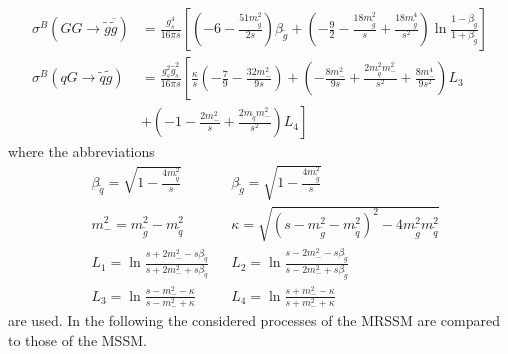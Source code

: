 \begin{align}
\sigma^B(GG \to \tilde{g}\overline{\tilde{g}}) &= \frac{g_s^4}{16\pi s} \left[ \left( -6 - \frac{51 m_{\tilde{g}}^2}{2s} \right)\beta_{\tilde{g}} + \left( -\frac{9}{2} - \frac{18 m_{\tilde{g}}^2}{s} + \frac{18 m_{\tilde{g}}^4}{s^2} \right)\ln \frac{1-\beta_{\tilde{g}}}{1+\beta_{\tilde{g}}} \right]\\
\sigma^B(q G \to \tilde{q} \tilde{g}) &= \frac{g_s^2\hat{g}_s^2}{16\pi s} \left[ \frac{\kappa}{s}\left( -\frac{7}{9} - \frac{32 m_{-}^2}{9s} \right) + \left( -\frac{8m_-^2}{9s} + \frac{2m_{\tilde{q}}^2m_-^2}{s^2} + \frac{8 m_-^4}{9s^2} \right)L_3\right.\nonumber\\
&+\left. \left( -1-\frac{2m_-^2}{s} + \frac{2m_{\tilde{q}}m_-^2}{s^2} \right)L_4 \right]
\end{align}
where the abbreviations \cite{Beenakker:1996ch} 
\begin{align}
&\beta_{\tilde{q}} = \sqrt{1-\frac{4 m_{\tilde{q}}^2}{s}} && \beta_{\tilde{g}} = \sqrt{1-\frac{4 m_{\tilde{g}}^2}{s}}\nonumber\\
&m_-^2 = m_{\tilde{g}}^2 - m_{\tilde{q}}^2 && \kappa = \sqrt{(s-m_{\tilde{g}}^2-m_{\tilde{q}}^2)^2-4m_{\tilde{g}}^2m_{\tilde{q}}^2}\nonumber\\
& L_1 = \ln \frac{s+2m_-^2 - s\beta_{\tilde{q}}}{s+2m_-^2 + s\beta_{\tilde{q}}} && L_2= \ln \frac{s - 2m_-^2 - s\beta_{\tilde{g}}}{s - 2m_-^2 + s\beta_{\tilde{g}}}\nonumber\\
& L_3 = \ln \frac{s - m_-^2 - \kappa}{s - m_-^2 + \kappa} && L_4= \ln \frac{s + m_-^2 - \kappa}{s + m_-^2 + \kappa}
\end{align}
are used. In the following the considered processes of the MRSSM are compared to those of the MSSM.

